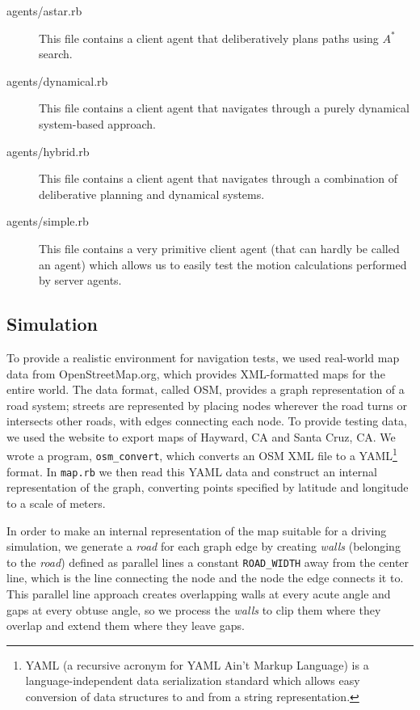 \documentclass{article}
\newcommand{\code}{\texttt}
\begin{document}
\begin{description}
\item[agents/astar.rb] This file contains a client agent that deliberatively
  plans paths using $A^*$ search.

\item[agents/dynamical.rb] This file contains a client agent that navigates
  through a purely dynamical system-based approach.

\item[agents/hybrid.rb] This file contains a client agent that navigates through
  a combination of deliberative planning and dynamical systems.

\item[agents/simple.rb] This file contains a very primitive client agent (that
  can hardly be called an agent) which allows us to easily test the motion
  calculations performed by server agents.

\end{description}

\subsection{Simulation}
To provide a realistic environment for navigation tests, we used real-world map
data from OpenStreetMap.org, which provides XML-formatted maps for the entire
world. The data format, called OSM, provides a graph representation of a road
system; streets are represented by placing nodes wherever the road turns or
intersects other roads, with edges connecting each node. To provide testing
data, we used the website to export maps of Hayward, CA and Santa Cruz, CA. We
wrote a program, \code{osm\_convert}, which converts an OSM XML file to a
YAML\footnote{YAML (a recursive acronym for YAML Ain't Markup Language) is a
  language-independent data serialization standard which allows easy conversion
  of data structures to and from a string representation.} format. In
\code{map.rb} we then read this YAML data and construct an internal
representation of the graph, converting points specified by latitude and
longitude to a scale of meters.

In order to make an internal representation of the map suitable for a driving
simulation, we generate a \emph{road} for each graph edge by creating
\emph{walls} (belonging to the \emph{road}) defined as parallel lines a constant
\code{ROAD\_WIDTH} away from the center line, which is the line connecting the
node and the node the edge connects it to. This parallel line approach creates
overlapping walls at every acute angle and gaps at every obtuse angle, so we
process the \emph{walls} to clip them where they overlap and extend them where
they leave gaps.
\end{document}
